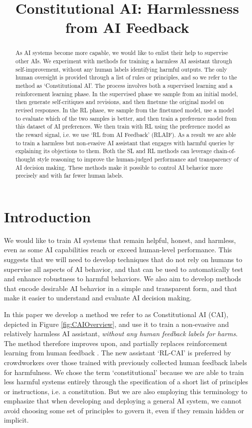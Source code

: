 \title{Constitutional AI: Harmlessness from AI Feedback}

\begin{abstract}
As AI systems become more capable, we would like to enlist their help to supervise other AIs. We experiment with methods for training a harmless AI assistant through self-improvement, without any human labels identifying harmful outputs.  The only human oversight is provided through a list of rules or principles, and so we refer to the method as `Constitutional AI'.  The process involves both a supervised learning and a reinforcement learning phase. In the supervised phase we sample from an initial model, then generate self-critiques and revisions, and then finetune the original model on revised responses. In the RL phase, we sample from the finetuned model, use a model to evaluate which of the two samples is better, and then train a preference model from this dataset of AI preferences.  We then train with RL using the preference model as the reward signal, i.e. we use `RL from AI Feedback' (RLAIF).  As a result we are able to train a harmless but non-evasive AI assistant that engages with harmful queries by explaining its objections to them.  Both the SL and RL methods can leverage chain-of-thought style reasoning to improve the human-judged performance and transparency of AI decision making.  These methods make it possible to control AI behavior more precisely and with far fewer human labels.
\end{abstract}

\section{Introduction}

We would like to train AI systems that remain helpful, honest, and harmless, even as some AI capabilities reach or exceed human-level performance.  This suggests that we will need to develop techniques that do not rely on humans to supervise all aspects of AI behavior, and that can be used to automatically test and enhance robustness to harmful behaviors.  We also aim to develop methods that encode desirable AI behavior in a  simple and transparent form, and that make it easier to understand and evaluate AI decision making.

In this paper we  develop a method we refer to as Constitutional AI (CAI), depicted in  Figure \ref{fig:CAIOverview}, and use it to train a non-evasive and relatively harmless AI assistant, \emph{without any human feedback labels for harms}.  The method therefore improves upon, and partially replaces reinforcement learning from human feedback \cite{christiano2017deep}.  The new assistant `RL-CAI' is preferred by crowdworkers over those trained with previously collected \cite{bai2022training, DeepRedTeaming} human feedback labels for harmfulness. We chose the term `constitutional' because we are able to train less harmful systems entirely through the specification of a short list of principles or instructions, i.e. a constitution.  But we are also employing this terminology to emphasize that when developing and deploying a general AI system, we cannot avoid choosing some set of principles to govern it, even if they remain hidden or implicit.  

